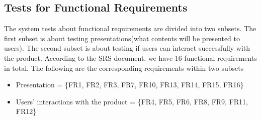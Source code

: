 \documentclass[12pt, titlepage]{article}
\begin{document}
\subsection{Tests for Functional Requirements}
The system tests about functional requirements
are divided into two subsets. The first subset is about 
testing presentations(what
contents will be presented to users). The second subset is about
testing if users can interact successfully with the product.
According to the SRS document, we have
16 functional requirements in total. The following are the
corresponding requirements within  two subsets
\begin{itemize}
\item Presentation = \{FR1, FR2, FR3, FR7, FR10, FR13, FR14, FR15,
FR16\}
\item Users' interactions with the product = \{FR4, FR5, FR6, 
FR8, FR9, FR11, FR12\}
\end{itemize}
\end{document}
